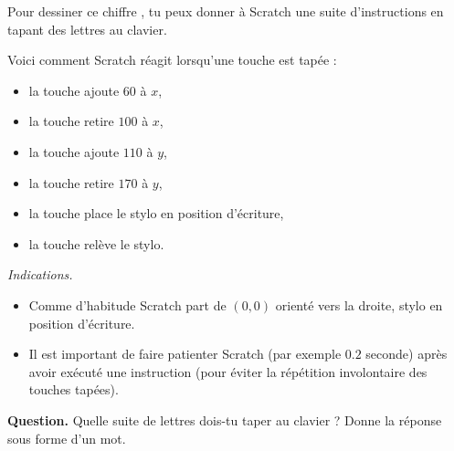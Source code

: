 \documentclass[class=report,crop=false, 12pt]{standalone}
\begin{document}
\begin{enigme}

Pour dessiner ce chiffre  \fg{}, tu peux donner à Scratch une suite d'instructions en tapant des lettres au clavier.


Voici comment Scratch réagit lorsqu'une touche est tapée : 
\begin{itemize}
  \item la touche  ajoute $60$ à $x$,
  \item la touche  retire $100$ à $x$,
  \item la touche  ajoute $110$ à $y$,
  \item la touche  retire $170$ à $y$,  
  \item la touche  place le stylo en position d'écriture,
  \item la touche  relève le stylo.  
\end{itemize}

\bigskip

\emph{Indications.}
\begin{itemize}
  \item Comme d'habitude Scratch part de $(0,0)$ orienté vers la droite, stylo en position d'écriture.
  
  \item Il est important de faire patienter Scratch (par exemple $0.2$ seconde) après avoir exécuté une instruction
  (pour éviter la répétition involontaire des touches tapées).
   
\end{itemize}

\bigskip

\textbf{Question.} Quelle suite de lettres dois-tu taper au clavier ?
Donne la réponse sous forme d'un mot.



\end{enigme}
\end{document}
